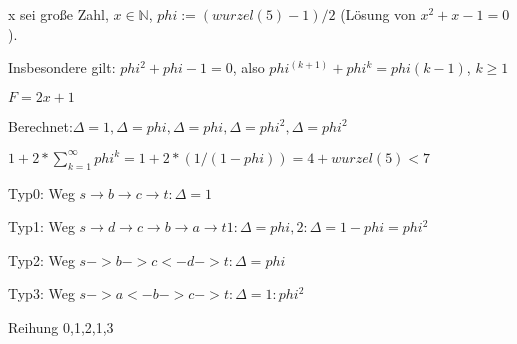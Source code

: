 \begin{beispiel}
x sei große Zahl, $x \in \mathbb{N}$, $phi:= (wurzel(5)-1)/2$ (Lösung von $x^2+x-1=0$).  

Insbesondere gilt: $phi^2+phi-1=0$, also $phi^(k+1)+phi^k = phi(k-1)$, $k \ge 1$
%	

$F= 2x +1$

Berechnet:$ \Delta =1, \Delta = phi, \Delta = phi, \Delta = phi^2, \Delta = phi^2$

$1+2* \sum_{k=1}^{\infty} phi^k = 1 + 2*(1/(1-phi)) = 4 + wurzel(5) <7$

Typ0: Weg $s \rightarrow b \rightarrow c \rightarrow t : \Delta =1$

Typ1: Weg $s \rightarrow d \rightarrow c \rightarrow b \rightarrow a \rightarrow t 1: \Delta = phi, 2:\Delta = 1-phi = phi^2$

Typ2: Weg $s->b->c<-d->t : \Delta = phi$

Typ3: Weg $s->a<-b->c->t : \Delta = 1:phi^2$

Reihung 0,1,2,1,3
\end{beispiel}
